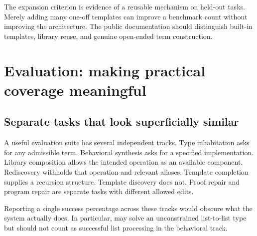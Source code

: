 The expansion criterion is evidence of a reusable mechanism on held-out tasks. Merely adding many one-off templates can improve a benchmark count without improving the architecture. The public documentation should distinguish built-in templates, library reuse, and genuine open-ended term construction.

\section{Evaluation: making practical coverage meaningful}
\label{sec:evaluation}
\subsection{Separate tasks that look superficially similar}
A useful evaluation suite has several independent tracks. Type inhabitation asks for any admissible term. Behavioral synthesis asks for a specified implementation. Library composition allows the intended operation as an available component. Rediscovery withholds that operation and relevant aliases. Template completion supplies a recursion structure. Template discovery does not. Proof repair and program repair are separate tasks with different allowed edits.

Reporting a single success percentage across these tracks would obscure what the system actually does. In particular,  may solve an unconstrained list-to-list type but should not count as successful list processing in the behavioral track.

